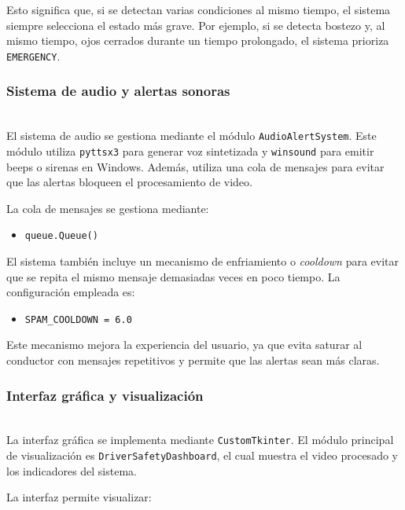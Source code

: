 \documentclass[conference]{IEEEtran}
\begin{document}
Esto significa que, si se detectan varias condiciones al mismo tiempo, el sistema siempre selecciona el estado más grave. Por ejemplo, si se detecta bostezo y, al mismo tiempo, ojos cerrados durante un tiempo prolongado, el sistema prioriza \texttt{EMERGENCY}.


\subsubsection{Sistema de audio y alertas sonoras}\mbox{}\\

El sistema de audio se gestiona mediante el módulo \texttt{AudioAlertSystem}. Este módulo utiliza \texttt{pyttsx3} para generar voz sintetizada y \texttt{winsound} para emitir beeps o sirenas en Windows. Además, utiliza una cola de mensajes para evitar que las alertas bloqueen el procesamiento de video.

La cola de mensajes se gestiona mediante:

\begin{itemize}
    \item \texttt{queue.Queue()}
\end{itemize}

El sistema también incluye un mecanismo de enfriamiento o \textit{cooldown} para evitar que se repita el mismo mensaje demasiadas veces en poco tiempo. La configuración empleada es:

\begin{itemize}
    \item \texttt{SPAM\_COOLDOWN = 6.0}
\end{itemize}

Este mecanismo mejora la experiencia del usuario, ya que evita saturar al conductor con mensajes repetitivos y permite que las alertas sean más claras.


\subsubsection{Interfaz gráfica y visualización}\mbox{}\\

La interfaz gráfica se implementa mediante \texttt{CustomTkinter}. El módulo principal de visualización es \texttt{DriverSafetyDashboard}, el cual muestra el video procesado y los indicadores del sistema.

La interfaz permite visualizar:
\end{document}
